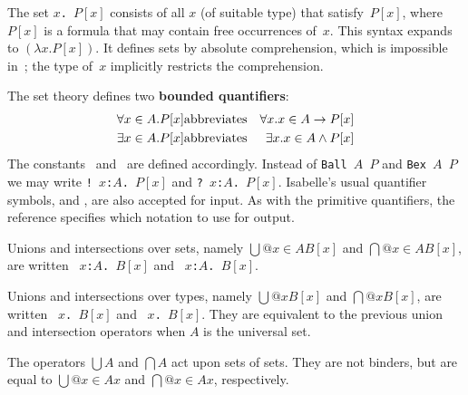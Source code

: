 The set \hbox{\tt{\ttlbrace}$x$.\ $P[x]${\ttrbrace}} consists of all $x$ (of suitable type)
that satisfy~$P[x]$, where $P[x]$ is a formula that may contain free
occurrences of~$x$.  This syntax expands to $(\lambda
x. P[x])$.  It defines sets by absolute comprehension, which is impossible
in~{\ZF}; the type of~$x$ implicitly restricts the comprehension.

The set theory defines two {\bf bounded quantifiers}:
\begin{eqnarray*}
   \forall x\in A. P[x] &\hbox{abbreviates}& \forall x. x\in A\rightarrow P[x] \\
   \exists x\in A. P[x] &\hbox{abbreviates}& \exists x. x\in A\wedge P[x]
\end{eqnarray*}
The constants~ and~ are defined
accordingly.  Instead of \texttt{Ball $A$ $P$} and \texttt{Bex $A$ $P$} we may
write
%
\hbox{\tt !~$x$:$A$.\ $P[x]$} and \hbox{\tt ?~$x$:$A$.\ $P[x]$}.  Isabelle's
usual quantifier symbols,  and , are also accepted
for input.  As with the primitive quantifiers, the {\ML} reference
 specifies which notation to use for output.

Unions and intersections over sets, namely $\bigcup@{x\in A}B[x]$ and
$\bigcap@{x\in A}B[x]$, are written 
~\hbox{\tt$x$:$A$.\ $B[x]$} and
~\hbox{\tt$x$:$A$.\ $B[x]$}.  

Unions and intersections over types, namely $\bigcup@x B[x]$ and $\bigcap@x
B[x]$, are written ~\hbox{\tt$x$.\ $B[x]$} and
~\hbox{\tt$x$.\ $B[x]$}.  They are equivalent to the previous
union and intersection operators when $A$ is the universal set.

The operators $\bigcup A$ and $\bigcap A$ act upon sets of sets.  They are
not binders, but are equal to $\bigcup@{x\in A}x$ and $\bigcap@{x\in A}x$,
respectively.



